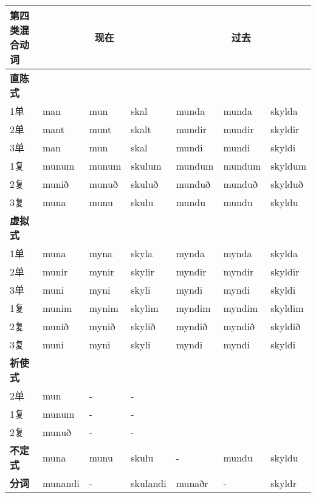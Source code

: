 \begin{longtable}{lllllll}
    \toprule
    第四类混合动词      & \multicolumn{3}{c}{现在} & \multicolumn{3}{c}{过去}                                        \\
    \midrule
    \endhead
    \bottomrule
    \endfoot
    \textbf{直陈式} & ~                      & ~                      & ~        & ~      & ~      & ~       \\
    1单           & man                    & mun                    & skal     & munda  & munda  & skylda  \\
    2单           & mant                   & munt                   & skalt    & mundir & mundir & skyldir \\
    3单           & man                    & mun                    & skal     & mundi  & mundi  & skyldi  \\
    1复           & munum                  & munum                  & skulum   & mundum & mundum & skyldum \\
    2复           & munið                  & munuð                  & skuluð   & munduð & munduð & skylduð \\
    3复           & muna                   & munu                   & skulu    & mundu  & mundu  & skyldu  \\
    \textbf{虚拟式} & ~                      & ~                      & ~        & ~      & ~      & ~       \\
    1单           & muna                   & myna                   & skyla    & mynda  & mynda  & skylda  \\
    2单           & munir                  & mynir                  & skylir   & myndir & myndir & skyldir \\
    3单           & muni                   & myni                   & skyli    & myndi  & myndi  & skyldi  \\
    1复           & munim                  & mynim                  & skylim   & myndim & myndim & skyldim \\
    2复           & munið                  & mynið                  & skylið   & myndið & myndið & skyldið \\
    3复           & muni                   & myni                   & skyli    & myndi  & myndi  & skyldi  \\
    \textbf{祈使式} & ~                      & ~                      & ~        & ~      & ~      & ~       \\
    2单           & mun                    & -                      & -        & ~      & ~      & ~       \\
    1复           & munum                  & -                      & -        & ~      & ~      & ~       \\
    2复           & munuð                  & -                      & -        & ~      & ~      & ~       \\
    \textbf{不定式} & muna                   & munu                   & skulu    & -      & mundu  & skyldu  \\
    \textbf{分词}  & munandi                & -                      & skulandi & munaðr & -      & skyldr  \\
\end{longtable}
